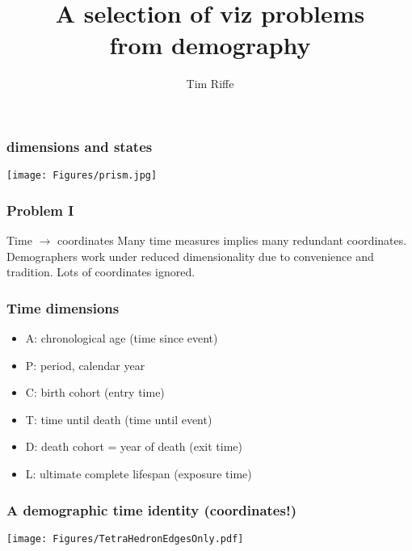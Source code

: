 \documentclass[20pt]{beamer}
\title{A selection of viz problems\\ from demography}
\subtitle{Tim Riffe}		%
\begin{document}

\begin{frame}
	\titlepage
\end{frame}

\begin{frame}
\frametitle{dimensions and states}
\vspace{-10em}
\begin{center}
\hspace*{-6cm}\texttt{[image: Figures/prism.jpg]}
\end{center}
\end{frame}


\begin{frame}
\frametitle{Problem I}
\begin{block}{Time $\rightarrow$ coordinates}
Many time measures implies many
redundant coordinates. Demographers work under reduced dimensionality due to
convenience and tradition. Lots of coordinates ignored.
\end{block}
\end{frame}


\begin{frame}
\frametitle{Time dimensions}
\begin{itemize}[<+->]
  \item A: chronological age (time since event)
  \item P: period, calendar year 
  \item C: birth cohort (entry time)
  \item T: time until death (time until event)
  \item D: death cohort = year of death (exit time)
  \item L: ultimate complete lifespan (exposure time)
\end{itemize}
\end{frame}


\begin{frame}
\frametitle{A demographic time identity (coordinates!)}
\vspace{-4em}
\begin{center}
\texttt{[image: Figures/TetraHedronEdgesOnly.pdf]}
\end{center}
\end{frame}
\end{document}
